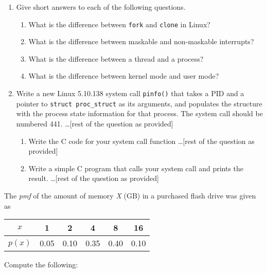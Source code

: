 \documentclass[letterpaper,12pt,addpoints]{exam}
\begin{document}
\begin{questions}
\begin{parts}
\begin{enumerate}
\begin{enumerate}[label=\alph*.]
            \item Explain in English a more robust method than the one used \ldots [rest of the question as provided]
            \item You are now told that due to a new change in x99, there are high priority interrupts \ldots [rest of the question as provided]
        \end{enumerate}
        \item Give short answers to each of the following questions.
        \begin{enumerate}[label=\alph*.]
            \item What is the difference between \texttt{fork} and \texttt{clone} in Linux?
            \item What is the difference between maskable and non-maskable interrupts?
            \item What is the difference between a thread and a process?
            \item What is the difference between kernel mode and user mode?
        \end{enumerate}
        \item Write a new Linux 5.10.138 system call \texttt{pinfo()} that takes a PID and a pointer to \texttt{struct proc\_struct} as its arguments, and populates the structure with the process state information for that process. The system call should be numbered 441. \ldots [rest of the question as provided]
        \begin{enumerate}[label=\alph*.]
            \item Write the C code for your system call function \ldots [rest of the question as provided]
            \item Write a simple C program that calls your system call and prints the result. \ldots [rest of the question as provided]
        \end{enumerate}
    \end{enumerate}
\end{parts}

\clearpage
\question
The \textit{pmf} of the amount of memory \textit{X} (GB) in a purchased flash drive was given as
\begin{center}
\begin{tabular}{c|c|c|c|c|c} 
 $x$ & 1 & 2 & 4 & 8 & 16 \\
 \hline
 $p(x)$ & 0.05 & 0.10 & 0.35 & 0.40 & 0.10\\  
\end{tabular}
\end{center}
Compute the following:
\begin{parts}

\end{parts}
\end{questions}
\end{document}
